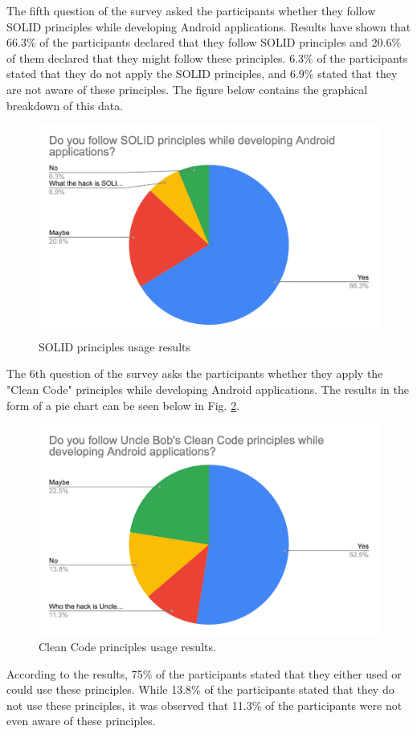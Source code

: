 The fifth question of the survey asked the participants whether they follow SOLID principles while developing Android applications. Results have shown that 66.3\% of the participants declared that they follow SOLID principles and 20.6\% of them declared that they might follow these principles. 6.3\% of the participants stated that they do not apply the SOLID principles, and 6.9\% stated that they are not aware of these principles. The figure below contains the graphical breakdown of this data.
\begin{figure}[ht!]
    \centering
    \includegraphics[scale=0.27]{figures/solid.png}
    \caption{SOLID principles usage results}
    \label{fig:solid}
\end{figure}
\FloatBarrier

The 6th question of the survey asks the participants whether they apply the "Clean Code" principles while developing Android applications. The results in the form of a pie chart can be seen below in Fig. \ref{fig:clean_code}.
\begin{figure}[ht!]
    \centering
    \includegraphics[scale=0.27]{figures/clean_code.png}
    \caption{Clean Code principles usage results.}
    \label{fig:clean_code}
\end{figure}
\FloatBarrier

According to the results, 75\% of the participants stated that they either used or could use these principles. While 13.8\% of the participants stated that they do not use these principles, it was observed that 11.3\% of the participants were not even aware of these principles.
